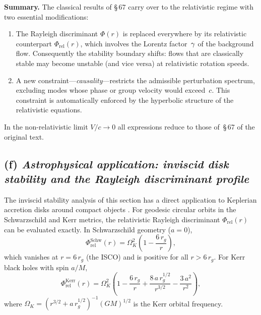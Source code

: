 \medskip
\noindent\textbf{Summary.}\quad
The classical results of \S\,67 carry over to the relativistic regime
with two essential modifications:
\begin{enumerate}
\item The Rayleigh discriminant $\Phi(r)$ is replaced everywhere by
  its relativistic counterpart $\Phi_{\mathrm{rel}}(r)$, which
  involves the Lorentz factor~$\gamma$ of the background flow.
  Consequently the stability boundary shifts: flows that are
  classically stable may become unstable (and vice versa) at
  relativistic rotation speeds.
\item A new constraint---\emph{causality}---restricts the admissible
  perturbation spectrum, excluding modes whose phase or group velocity
  would exceed~$c$.  This constraint is automatically enforced by the
  hyperbolic structure of the relativistic equations.
\end{enumerate}
In the non-relativistic limit $V/c\to0$ all expressions reduce to
those of~\S\,67 of the original text.

\subsection*{(f) \emph{Astrophysical application: inviscid disk
  stability and the Rayleigh discriminant profile}}
\label{sec:rel-7-67f}

The inviscid stability analysis of this section has a direct
application to Keplerian accretion disks around compact objects
\citep{Seguin1975,FrankKingRaine2002}.  For geodesic circular orbits
in the Schwarzschild and Kerr metrics, the relativistic Rayleigh
discriminant $\Phi_{\mathrm{rel}}(r)$ can be evaluated exactly.  In
Schwarzschild geometry ($a=0$),
\begin{equation}
\label{eq:rel-7-Phi-Schw}
\Phi_{\mathrm{rel}}^{\mathrm{Schw}}(r)
= \Omega_{K}^{2}\!\left(1-\frac{6\,r_{g}}{r}\right),
\end{equation}
which vanishes at $r=6\,r_{g}$ (the ISCO) and is positive for all
$r>6\,r_{g}$.  For Kerr black holes with spin $a/M$,
\begin{equation}
\label{eq:rel-7-Phi-Kerr}
\Phi_{\mathrm{rel}}^{\mathrm{Kerr}}(r)
= \Omega_{K}^{2}\!\left(1-\frac{6\,r_{g}}{r}
  +\frac{8\,a\,r_{g}^{1/2}}{r^{3/2}}
  -\frac{3\,a^{2}}{r^{2}}\right),
\end{equation}
where $\Omega_{K}=(r^{3/2}+a\,r_{g}^{1/2})^{-1}(GM)^{1/2}$ is the
Kerr orbital frequency.

